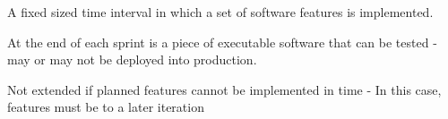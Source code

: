 \documentclass[
    ../../Software_Engineering_Summary.tex,
]
{subfiles}
\begin{document}
\begin{defbox}
     A fixed sized time interval in which a set of software features is implemented. 

    At the end of each sprint is a piece of executable software that can be tested - may or may not be deployed into production.

     Not extended if planned features cannot be implemented in time - In this case, features must be  to a later iteration

    \begin{center}
    \end{center}
\end{defbox}
\end{document}
